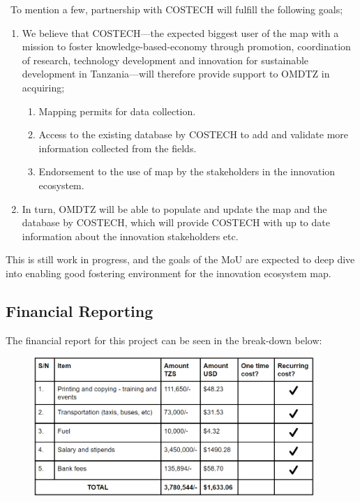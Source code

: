 \documentclass[a4paper,12pt,twoside]{article}
\begin{document}
\
To mention a few, partnership with COSTECH will fulfill the following goals;
\begin{enumerate}
    \item We believe that COSTECH---the expected biggest user of the map with a mission to foster knowledge-based-economy through promotion, coordination of research, technology development and innovation for sustainable development in Tanzania---will therefore provide support to OMDTZ in acquiring;
    \begin{enumerate}
        \begin{enumerate}
            \item Mapping permits for data collection.
            \item Access to the existing database by COSTECH to add and validate more information collected from the fields.
            \item Endorsement to the use of map by the stakeholders in the innovation ecosystem.
        \end{enumerate}
    \end{enumerate}
    \item In turn, OMDTZ will be able to populate and update the map and the database by COSTECH, which will provide COSTECH with up to date information about the innovation stakeholders etc.
\end{enumerate}
This is still work in progress, and the goals of the MoU are expected to deep dive into enabling good fostering environment for the innovation ecosystem map.

\subsection{Financial Reporting}
The financial report for this project can be seen in the break-down below:

\begin{figure}[h]
  \centering
  \includegraphics[width=0.95\textwidth]{Financial_model2.PNG}
\end{figure}
\end{document}

